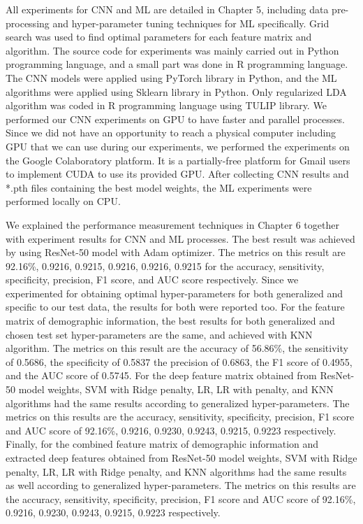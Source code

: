 All experiments for CNN and ML are detailed in Chapter 5, including data pre-processing and hyper-parameter tuning techniques for ML specifically. Grid search was used to find optimal parameters for each feature matrix and algorithm. The source code for experiments was mainly carried out in Python programming language, and a small part was done in R programming language. The CNN models were applied using PyTorch library in Python, and the ML algorithms were applied using Sklearn library in Python. Only regularized LDA algorithm was coded in R programming language using TULIP library. We performed our CNN experiments on GPU to have faster and parallel processes. Since we did not have an opportunity to reach a physical computer including GPU that we can use during our experiments, we performed the experiments on the Google Colaboratory platform. It is a partially-free platform for Gmail users to implement CUDA to use its provided GPU. After collecting CNN results and *.pth files containing the best model weights, the ML experiments were performed locally on CPU.

We explained the performance measurement techniques in Chapter 6 together with experiment results for CNN and ML processes. The best result was achieved by using ResNet-50 model with Adam optimizer. The metrics on this result are 92.16\%, 0.9216, 0.9215, 0.9216, 0.9216, 0.9215 for the accuracy, sensitivity, specificity, precision, F1 score, and AUC score respectively. Since we experimented for obtaining optimal hyper-parameters for both generalized and specific to our test data, the results for both were reported too. For the feature matrix of demographic information, the best results for both generalized and chosen test set hyper-parameters are the same, and achieved with KNN algorithm. The metrics on this result are the accuracy of 56.86\%, the sensitivity of 0.5686, the specificity of 0.5837 the precision of 0.6863, the F1 score of 0.4955, and the AUC score of 0.5745. For the deep feature matrix obtained from ResNet-50 model weights, SVM with Ridge penalty, LR, LR with penalty, and KNN algorithms had the same results according to generalized hyper-parameters. The metrics on this results are the accuracy, sensitivity, specificity, precision, F1 score and AUC score of 92.16\%, 0.9216, 0.9230, 0.9243, 0.9215, 0.9223 respectively. Finally, for the combined feature matrix of demographic information and extracted deep features obtained from ResNet-50 model weights, SVM with Ridge penalty, LR, LR with Ridge penalty, and KNN algorithms had the same results as well according to generalized hyper-parameters. The metrics on this results are the accuracy, sensitivity, specificity, precision, F1 score and AUC score of 92.16\%, 0.9216, 0.9230, 0.9243, 0.9215, 0.9223 respectively.

